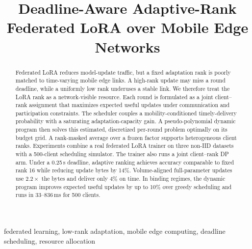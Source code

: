\documentclass[conference]{IEEEtran}
\begin{document}
\linespread{0.96}\selectfont

\title{Deadline-Aware Adaptive-Rank Federated LoRA over Mobile Edge Networks}

\author{
}

\maketitle

\begin{abstract}
Federated LoRA reduces model-update traffic, but a fixed adaptation rank is poorly matched to time-varying mobile edge links. A high-rank update may miss a round deadline, while a uniformly low rank underuses a stable link. We therefore treat the LoRA rank as a network-visible resource. Each round is formulated as a joint client--rank assignment that maximizes expected useful updates under communication and participation constraints. The scheduler couples a mobility-conditioned timely-delivery probability with a saturating adaptation-capacity gain. A pseudo-polynomial dynamic program then solves this estimated, discretized per-round problem optimally on its budget grid. A rank-masked average over a frozen factor supports heterogeneous client ranks. Experiments combine a real federated LoRA trainer on three non-IID datasets with a 500-client scheduling simulator. The trainer also runs a joint client--rank DP arm. Under a 0.25\,s deadline, adaptive ranking achieves accuracy comparable to fixed rank 16 while reducing update bytes by 14\%. Volume-aligned full-parameter updates use $2.2\times$ the bytes and deliver only 4\% on time. In binding regimes, the dynamic program improves expected useful updates by up to 10\% over greedy scheduling and runs in 33--836\,ms for 500 clients.
\end{abstract}

\begin{IEEEkeywords}
federated learning, low-rank adaptation, mobile edge computing, deadline scheduling, resource allocation
\end{IEEEkeywords}
\end{document}
